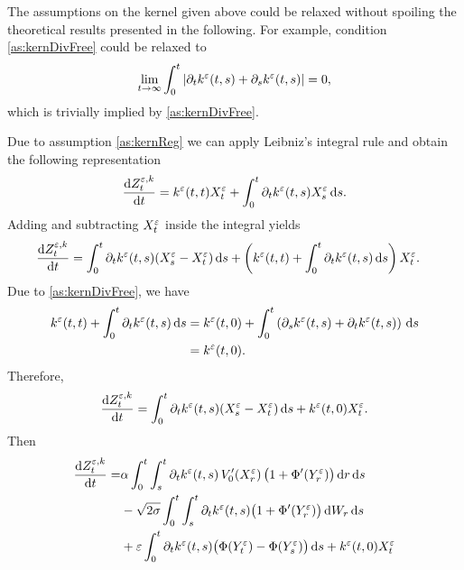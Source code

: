 \documentclass[10pt]{article}
\begin{document}
\begin{remark} The assumptions on the kernel given above could be relaxed without spoiling the theoretical results presented in the following. For example, condition \ref{as:kernDivFree} could be relaxed to
	\begin{equation}
		\lim_{t\to\infty}\int_0^t \left\lvert\partial_t k^\varepsilon(t, s) + \partial_s k^\varepsilon(t, s)\right\rvert = 0, 
	\end{equation}
	which is trivially implied by \eqref{as:kernDivFree}.
\end{remark}

Due to assumption \eqref{as:kernReg} we can apply Leibniz's integral rule and obtain the following representation
\begin{equation}
	\frac{\mathrm{d} Z^{\varepsilon,k}_t}{\mathrm{d} t} = k^\varepsilon(t, t)X^\varepsilon_t + \int_0^t \partial_t k^\varepsilon(t, s) X^\varepsilon_s \,\mathrm{d} s.
\end{equation}
Adding and subtracting $X_t^\varepsilon$ inside the integral yields
\begin{equation}
\begin{aligned}
	\frac{\mathrm{d} Z^{\varepsilon,k}_t}{\mathrm{d} t} &= \int_0^t \partial_t k^\varepsilon(t, s) (X^\varepsilon_s - X^\varepsilon_t) \,\mathrm{d} s + \left(k^\varepsilon(t, t) + \int_0^t \partial_t k^\varepsilon(t, s) \,\mathrm{d} s\right)X^\varepsilon_t.
\end{aligned}
\end{equation}
Due to \eqref{as:kernDivFree}, we have
\begin{equation}
\begin{aligned}
	k^\varepsilon(t, t) + \int_0^t \partial_t k^\varepsilon(t, s) \,\mathrm{d} s &= k^\varepsilon(t, 0) + \int_0^t \left(\partial_s k^\varepsilon(t, s) + \partial_t k^\varepsilon(t, s)\right) \,\mathrm{d} s\\
	&= k^\varepsilon(t, 0).
\end{aligned}
\end{equation}
Therefore, 
\begin{equation}
\begin{aligned}
	\frac{\mathrm{d} Z^{\varepsilon,k}_t}{\mathrm{d} t} = \int_0^t \partial_t k^\varepsilon(t, s) (X^\varepsilon_s - X^\varepsilon_t) \,\mathrm{d} s + k^\varepsilon(t, 0) X^\varepsilon_t.
\end{aligned}
\end{equation}
Then
\begin{equation}
\begin{aligned}
\frac{\mathrm{d} Z^{\varepsilon,k}_t}{\mathrm{d} t} = &\alpha \int_0^t\int_s^t \partial_t k^\varepsilon(t, s) \, V_0'(X^\varepsilon_r)\, \big(1 + \Phi'(Y^\varepsilon_r)\big)\,\mathrm{d} r \,\mathrm{d} s  \\
&-\sqrt{2\sigma}\int_0^t\int_s^t \partial_t k^\varepsilon(t, s) \big(1 + \Phi'(Y^\varepsilon_r)\big) \,\mathrm{d} W_r \,\mathrm{d} s\\
&+ \varepsilon \int_0^t \partial_t k^\varepsilon(t, s) \big(\Phi(Y^\varepsilon_t)- \Phi(Y^\varepsilon_s)\big) \,\mathrm{d} s + k^\varepsilon(t, 0) X^\varepsilon_t
\end{aligned}
\end{equation}
\end{document}

